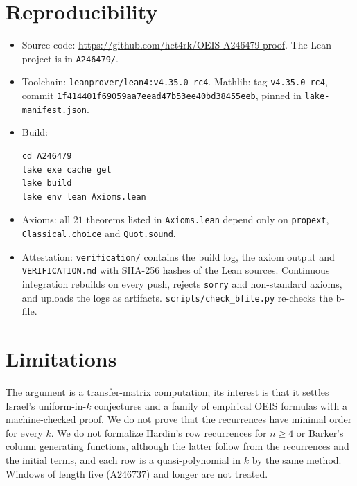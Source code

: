\documentclass[11pt]{article}
\theoremstyle{remark}\newtheorem{remark}[theorem]{Remark}
\begin{document}
\section{Reproducibility}
\begin{itemize}
\item Source code: \url{https://github.com/het4rk/OEIS-A246479-proof}. The Lean project is in \texttt{A246479/}.
\item Toolchain: \texttt{leanprover/lean4:v4.35.0-rc4}. Mathlib: tag \texttt{v4.35.0-rc4}, commit \nolinkurl{1f414401f69059aa7eead47b53ee40bd38455eeb}, pinned in \texttt{lake-manifest.json}.
\item Build:
\begin{verbatim}
cd A246479
lake exe cache get
lake build
lake env lean Axioms.lean
\end{verbatim}
\item Axioms: all $21$ theorems listed in \texttt{Axioms.lean} depend only on \texttt{propext}, \texttt{Classical.choice} and \texttt{Quot.sound}.
\item Attestation: \texttt{verification/} contains the build log, the axiom output and \texttt{VERIFICATION.md} with SHA-256 hashes of the Lean sources. Continuous integration rebuilds on every push, rejects \texttt{sorry} and non-standard axioms, and uploads the logs as artifacts. \texttt{scripts/check\_bfile.py} re-checks the b-file.
\end{itemize}

\section{Limitations}
The argument is a transfer-matrix computation; its interest is that it settles Israel's uniform-in-$k$ conjectures and a family of empirical OEIS formulas with a machine-checked proof. We do not prove that the recurrences have minimal order for every $k$. We do not formalize Hardin's row recurrences for $n\ge4$ or Barker's column generating functions, although the latter follow from the recurrences and the initial terms, and each row is a quasi-polynomial in $k$ by the same method. Windows of length five (A246737) and longer are not treated.
\end{document}
